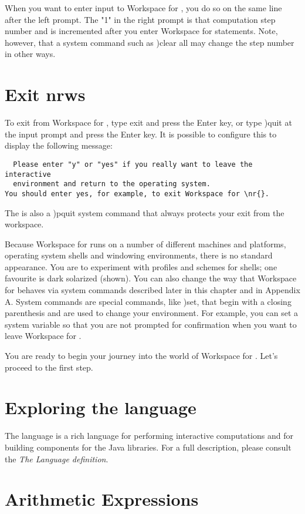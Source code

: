 
When you want to enter input to Workspace for \nr{}, you do so on the same line after the left prompt. The "1" in the right prompt is that computation step number and is incremented after you enter Workspace for \nr{} statements. Note, however, that a system command such as )clear all may change the step number in other ways.

\section{Exit nrws}
To exit from Workspace for \nr{}, type exit and press the Enter key,
or type )quit at the input prompt and press the Enter key. It is possible to configure this to display the following message:
\begin{verbatim}
  Please enter "y" or "yes" if you really want to leave the interactive
  environment and return to the operating system.
You should enter yes, for example, to exit Workspace for \nr{}.
\end{verbatim}
The is also a )pquit system command that always protects your exit from the workspace.

Because Workspace for \nr{} runs on a number of different machines and platforms, operating system shells and windowing environments, there is no standard appearance. You are to experiment with profiles and schemes for shells; one favourite is dark solarized (shown). You can also change the way that Workspace for \nr{} behaves via system commands described later in this chapter and in Appendix A. System commands are special commands, like )set, that begin with a closing parenthesis and are used to change your environment. For example, you can set a system variable so that you are not prompted for confirmation when you want to leave Workspace for \nr{}.

You are ready to begin your journey into the world of Workspace for \nr{}. Let's proceed to the first step.

 \section{Exploring the \nr{} language}

The \nr{} language is a rich language for performing interactive
computations and for building components for the Java libraries. For a
full description, please consult the \emph{The \nr{} Language definition}.

 \section{Arithmetic Expressions}

